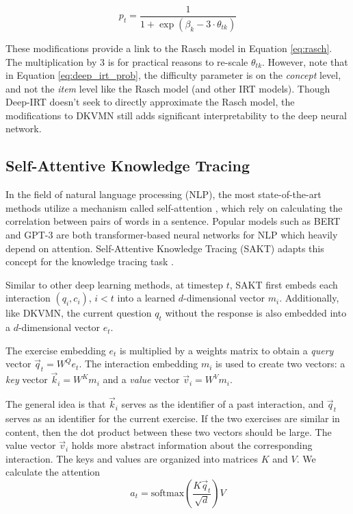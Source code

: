 \begin{equation}
  p_t = \frac{1}{1 + \exp\left( \beta_k - 3\cdot \theta_{tk} \right)}
  \label{eq:deep_irt_prob}
\end{equation}

These modifications provide a link to the Rasch model in Equation \ref{eq:rasch}. The multiplication by 3 is for practical reasons to re-scale $\theta_{tk}$. However, note that in Equation \ref{eq:deep_irt_prob}, the difficulty parameter is on the \textit{concept} level, and not the \textit{item} level like the Rasch model (and other IRT models). Though Deep-IRT doesn't seek to directly approximate the Rasch model, the modifications to DKVMN still adds significant interpretability to the deep neural network.


\subsection{Self-Attentive Knowledge Tracing}
In the field of natural language processing (NLP), the most state-of-the-art methods utilize a mechanism called self-attention \cite{vaswani2017}, which rely on calculating the correlation between pairs of words in a sentence. Popular models such as BERT \cite{bert} and GPT-3 \cite{gpt3} are both transformer-based neural networks for NLP which heavily depend on attention. Self-Attentive Knowledge Tracing (SAKT) adapts this concept for the knowledge tracing task \cite{pandey2019}. 

Similar to other deep learning methods, at timestep $t$, SAKT first embeds each interaction $(q_i, c_i)$, $i<t$ into a learned $d$-dimensional vector $m_i$. Additionally, like DKVMN, the current question $q_t$ without the response is also embedded into a $d$-dimensional vector $e_t$. 

The exercise embedding $e_t$ is multiplied by a weights matrix to obtain a \textit{query} vector $\vec q_t = W^{Q}e_t$. The interaction embedding $m_i$ is used to create two vectors: a \textit{key} vector $\vec k_i = W^{K}m_i$ and a \textit{value} vector $\vec v_i = W^V m_i$. 

The general idea is that $\vec k_i$ serves as the identifier of a past interaction, and $\vec q_t$ serves as an identifier for the current exercise. If the two exercises are similar in content, then the dot product between these two vectors should be large. The value vector $\vec v_i$ holds more abstract information about the corresponding interaction. The keys and values are organized into matrices $K$ and $V$. We calculate the attention
\begin{equation}
  a_{t} = \text{softmax}\left(\frac{K \vec q_t}{\sqrt{d}} \right) V
  \label{eq:attn}
\end{equation}

